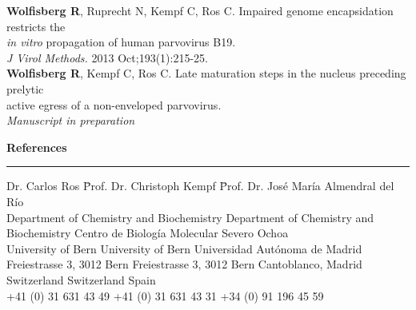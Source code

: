 \begin{addmargin}{0.025\textwidth}
\textbf{Wolfisberg R}, Ruprecht N, Kempf C, Ros C. Impaired genome encapsidation
restricts the \\
\textit{in vitro} propagation of human parvovirus B19. \\
\textit{J Virol Methods.} 2013 Oct;193(1):215-25. \\[0.3 cm]

\textbf{Wolfisberg R}, Kempf C, Ros C. Late maturation steps in the nucleus preceding prelytic\\
 active egress of a non-enveloped parvovirus.\\ 
 \textit{Manuscript in preparation}
\end{addmargin}

\vspace{0.5 cm}
\large
\textbf{References}
\noindent\rule[3mm]{\linewidth}{1pt}

\begin{tiny} 
\vspace{-0.4cm}
\begin{tabbing}
Dr. Carlos Ros \hspace{3.5 cm} \= Prof. Dr. Christoph Kempf \hspace{2 cm} \= Prof. Dr. José María Almendral del Río \\
Department of Chemistry and Biochemistry \> Department of Chemistry and Biochemistry \> Centro de Biología Molecular Severo Ochoa  \\
University of Bern \> University of Bern \> Universidad Autónoma de Madrid \\
Freiestrasse 3, 3012 Bern \> Freiestrasse 3, 3012 Bern \> Cantoblanco,  Madrid \\
Switzerland \> Switzerland \> Spain  \\ [0.1 cm]
+41 (0) 31 631 43 49 \> +41 (0) 31 631 43 31 \> +34 (0) 91 196 45 59
 \end{tabbing}
\end{tiny}